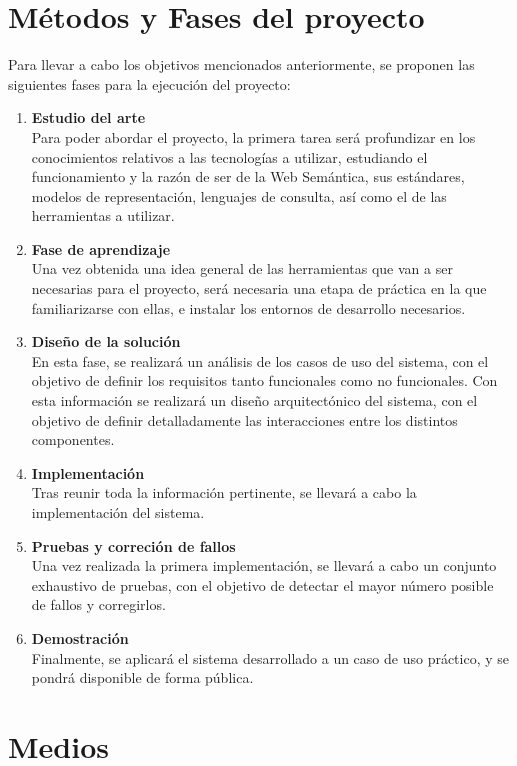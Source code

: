 \documentclass[a4paper,11pt]{report}
\begin{document}
\chapter*{Métodos y Fases del proyecto}

Para llevar a cabo los objetivos mencionados anteriormente, se proponen las siguientes fases para la ejecución del proyecto:
\begin{enumerate}
  \item \textbf{Estudio del arte } ~\\
  Para poder abordar el proyecto, la primera tarea será profundizar en los conocimientos relativos a las tecnologías a utilizar, estudiando el funcionamiento y la razón de ser de la Web Semántica, sus estándares, modelos de representación, lenguajes de consulta, así como el de las herramientas a utilizar.
  \item \textbf{Fase de aprendizaje} ~\\
  Una vez obtenida una idea general de las herramientas que van a ser necesarias para el proyecto, será necesaria una etapa de práctica en la que familiarizarse con ellas, e instalar los entornos de desarrollo necesarios.
  \item \textbf{Diseño de la solución} ~\\ 
  En esta fase, se realizará un análisis de los casos de uso del sistema, con el objetivo de definir los requisitos tanto funcionales como no funcionales. Con esta información se realizará un diseño arquitectónico del sistema, con el objetivo de definir detalladamente las interacciones entre los distintos componentes.
  \item \textbf{Implementación} ~\\
  Tras reunir toda la información pertinente, se llevará a cabo la implementación del sistema.
  \item \textbf{Pruebas y correción de fallos} ~\\
  Una vez realizada la primera implementación, se llevará a cabo un conjunto exhaustivo de pruebas, con el objetivo de detectar el mayor número posible de fallos y corregirlos.
  \item \textbf{Demostración } ~\\
  Finalmente, se aplicará el sistema desarrollado a un caso de uso práctico, y se pondrá disponible de forma pública.
\end{enumerate}

\chapter*{Medios}
\end{document}

